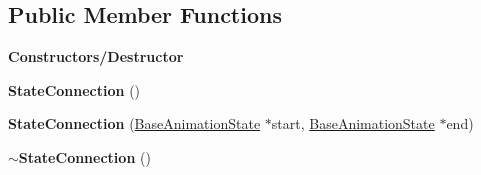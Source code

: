 \subsection*{Public Member Functions}
\begin{Indent}\textbf{ Constructors/\+Destructor}\par
\begin{DoxyCompactItemize}
\item 
\mbox{\label{classrev_1_1_state_connection_a23281cab2ce38a4dfa14ba9ddc0e0648}} 
{\bfseries State\+Connection} ()
\item 
\mbox{\label{classrev_1_1_state_connection_a72ac911d2f0ac63b603f4b28e8ef8851}} 
{\bfseries State\+Connection} (\mbox{\hyperlink{classrev_1_1_base_animation_state}{Base\+Animation\+State}} $\ast$start, \mbox{\hyperlink{classrev_1_1_base_animation_state}{Base\+Animation\+State}} $\ast$end)
\item 
\mbox{\label{classrev_1_1_state_connection_a789a069cd8cb12d2995a34fd9966355d}} 
{\bfseries $\sim$\+State\+Connection} ()
\end{DoxyCompactItemize}
\end{Indent}
